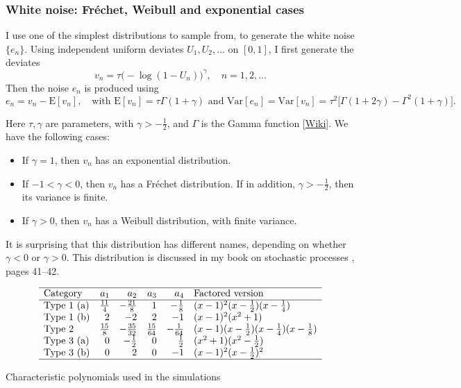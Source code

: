 \documentclass[oneside,10pt]{book}
\renewcommand{\arraystretch}{1.4} %
\begin{document}
\subsubsection{White noise: Fréchet, Weibull and exponential cases}

I use one of the simplest distributions to sample from, to generate the white noise $\{e_n\}$. Using independent uniform deviates $U_1,U_2,\dots$ on $[0, 1]$, I first generate the deviates 
\begin{equation}\label{eq1lin}
v_n=\tau\Big(-\log(1-U_n)\Big)^\gamma, \quad n=1,2,\dots
\end{equation}
Then the noise $e_n$ is produced using 
$$e_n=v_n-\text{E}[v_n],\quad \text{with } \text{E}[v_n]=\tau\Gamma(1+\gamma) \text{ and }
\text{Var}[e_n] = \text{Var}[v_n]= \tau^2\Big[\Gamma(1+2\gamma)-\Gamma^2(1+\gamma)\Big].$$

\noindent Here $\tau,\gamma$ are parameters, with $\gamma>-\frac{1}{2}$, and $\Gamma$ is the \textcolor{index}{Gamma function} [\href{https://en.wikipedia.org/wiki/Gamma_function}{Wiki}]. We have the following cases:
\begin{itemize}
\item If $\gamma=1$, then $v_n$ has an exponential distribution.
\item If $-1<\gamma<0$, then $v_n$ has a \textcolor{index}{Fréchet distribution}. If in addition, $\gamma>-\frac{1}{2}$, then its variance is finite. 
\item If $\gamma>0$, then $v_n$ has a \textcolor{index}{Weibull distribution}, with finite variance. 
\end{itemize}
It is surprising that this distribution has different names, depending on whether $\gamma<0$ or $\gamma>0$. This distribution is discussed in my book
on stochastic processes \cite{vgsimulnew}, pages 41--42.

\renewcommand{\arraystretch}{1.4} %
\begin{table}[H]
\[
\begin{array}{lrrrrl}
\hline
  \text{Category} & a_1 & a_2  & a_3 & a_4  & \text{Factored version}\\
\hline
\text{Type 1 (a)}	&	\frac{11}{4}	&	-\frac{21}{8}	&	1 & -\frac{1}{8}	&	(x-1)^2(x-\frac{1}{2})(x-\frac{1}{4}) \\
\text{Type 1 (b)}	&	2	&	-2	&	2	&	-1	&	(x-1)^2(x^2+1)\\
\text{Type 2}	&	\frac{15}{8}	& -\frac{35}{32} & \frac{15}{64} & -\frac{1}{64} &	(x-1)(x-\frac{1}{2})(x-\frac{1}{4})(x-\frac{1}{8}) \\
\text{Type 3 (a)}	&	0	&	-\frac{1}{2}	&	0	&	\frac{1}{2}	&	(x^2+1)(x^2-\frac{1}{2}) \\
\text{Type 3 (b)} 	&	0	&	2	&	0	&	-1	&	(x-1)^2(x-\frac{1}{2})^2\\ 
\hline
\end{array}
\]
\caption{\label{tablin1} Characteristic polynomials used in the simulations}
\end{table}
\renewcommand{\arraystretch}{1.0} %
\end{document}
